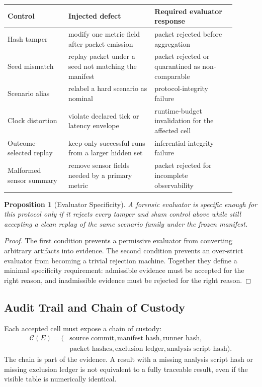 \documentclass[11pt,a4paper]{article}
\newtheorem{proposition}[theorem]{Proposition}
\theoremstyle{definition}
\begin{document}
\begin{center}
\begin{tabular}{p{0.24\linewidth}p{0.34\linewidth}p{0.32\linewidth}}
\toprule
Control & Injected defect & Required evaluator response \\
\midrule
Hash tamper & modify one metric field after packet emission & packet rejected before aggregation \\
Seed mismatch & replay packet under a seed not matching the manifest & packet rejected or quarantined as non-comparable \\
Scenario alias & relabel a hard scenario as nominal & protocol-integrity failure \\
Clock distortion & violate declared tick or latency envelope & runtime-budget invalidation for the affected cell \\
Outcome-selected replay & keep only successful runs from a larger hidden set & inferential-integrity failure \\
Malformed sensor summary & remove sensor fields needed by a primary metric & packet rejected for incomplete observability \\
\bottomrule
\end{tabular}
\end{center}

\begin{proposition}[Evaluator Specificity]
A forensic evaluator is specific enough for this protocol only if it rejects every
tamper and sham control above while still accepting a clean replay of the same
scenario family under the frozen manifest.
\end{proposition}

\begin{proof}
The first condition prevents a permissive evaluator from converting arbitrary
artifacts into evidence. The second condition prevents an over-strict evaluator
from becoming a trivial rejection machine. Together they define a minimal
specificity requirement: admissible evidence must be accepted for the right
reason, and inadmissible evidence must be rejected for the right reason.
\end{proof}

\subsection{Audit Trail and Chain of Custody}
Each accepted cell must expose a chain of custody:
\[
\begin{aligned}
\mathcal{C}(E)=\bigl(&\text{source commit},\text{manifest hash},\text{runner hash},\\
&\text{packet hashes},\text{exclusion ledger},\text{analysis script hash}\bigr).
\end{aligned}
\]
The chain is part of the evidence. A result with a missing analysis script hash or
missing exclusion ledger is not equivalent to a fully traceable result, even if the
visible table is numerically identical.
\end{document}
